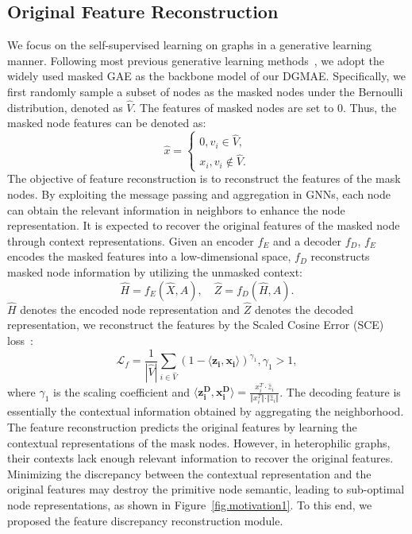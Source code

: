\documentclass[sigconf]{acmart}
\begin{document}
\subsection{Original Feature Reconstruction}
We focus on the self-supervised learning on graphs in a generative learning manner. Following most previous generative learning methods~\cite{graphmae,augmae,s2gae,maskgae,graphmae2}, we adopt the widely used masked GAE as the backbone model of our DGMAE. %
Specifically, we first randomly sample a subset of nodes as the masked nodes under the Bernoulli distribution, denoted as $\widehat{V}$. The features of masked nodes are set to $0$. Thus, the masked node features can be denoted as:
\begin{equation}
    \widehat{x}=\left\{
    \begin{aligned}
    0, v_i \in \widehat{V}, \\
    x_i, v_i \notin \widehat{V}.
    \end{aligned}
    \right.
\end{equation}
The objective of feature reconstruction is to reconstruct the features of the mask nodes. By exploiting the message passing and aggregation in GNNs, each node can obtain the relevant information in neighbors to enhance the node representation. It is expected to recover the original features of the masked node through context representations. Given an encoder $f_E$ and a decoder $f_D$, $f_E$ encodes the masked features into a low-dimensional space, $f_D$ reconstructs masked node information by utilizing the unmasked context: 
\begin{equation}
\label{eq-unmask}
    \hat{H} = f_E(\hat{X}, A), \quad \hat{Z}=f_D(\hat{H}, A).
\end{equation}
$\hat{H}$ denotes the encoded node representation and $\hat{Z}$ denotes the decoded representation, we reconstruct the features by the Scaled Cosine Error (SCE) loss~\cite{graphmae,graphmae2,augmae,rare}:
\begin{equation}
\label{eq-ft-re}
    \mathcal{L}_f = \frac{1}{|\widehat{V}|} \sum \limits_{i \in \widehat{V}} (1-⟨\mathbf{z_i} ,\mathbf{x_i}⟩)^{\gamma_1},\gamma_1 > 1,
\end{equation}
where $\gamma_1$ is the scaling coefficient and $⟨\mathbf{z_i^D},\mathbf{x_i^D}⟩=\frac{x_i^T \cdot \hat{z}_i}{\Vert x_i^T \Vert \cdot \Vert \hat{z}_i \Vert}$. The decoding feature is essentially the contextual information obtained by aggregating the neighborhood. The feature reconstruction predicts the original features by learning the contextual representations of the mask nodes. However, in heterophilic graphs, their contexts lack enough relevant information to recover the original features. Minimizing the discrepancy between the contextual representation and the original features may destroy the primitive node semantic, leading to sub-optimal node representations, as shown in Figure~\ref{fig.motivation1}. To this end, we proposed the feature discrepancy reconstruction module.
\end{document}
